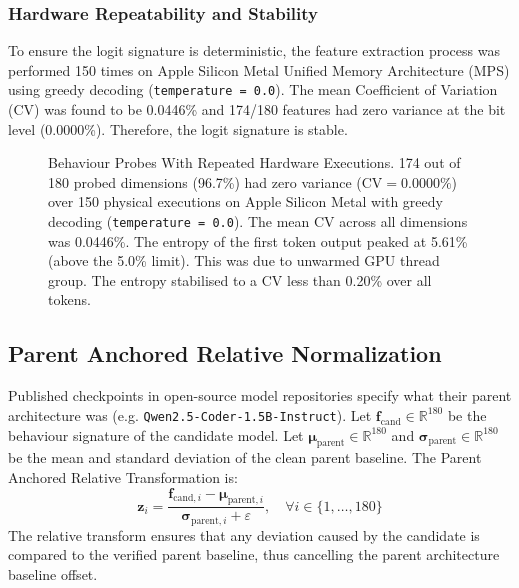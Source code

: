 \subsubsection{Hardware Repeatability and Stability}
To ensure the logit signature is deterministic, the feature extraction process was performed 150 times on Apple Silicon Metal Unified Memory Architecture (MPS) using greedy decoding (\texttt{temperature = 0.0}). The mean Coefficient of Variation (CV) was found to be 0.0446\% and 174/180 features had zero variance at the bit level (0.0000\%). Therefore, the logit signature is stable.

\begin{figure}[t]
\centering
{}
\caption{Behaviour Probes With Repeated Hardware Executions. 174 out of 180 probed dimensions (96.7\%) had zero variance ($\text{CV} = 0.0000\%$) over 150 physical executions on Apple Silicon Metal with greedy decoding (\texttt{temperature = 0.0}). The mean CV across all dimensions was 0.0446\%. The entropy of the first token output peaked at 5.61\% (above the 5.0\% limit). This was due to unwarmed GPU thread group. The entropy stabilised to a CV less than 0.20\% over all tokens.}
\label{fig:probe_repeatability}
\end{figure}

\subsection{Parent Anchored Relative Normalization}
\label{subsec:rq1_norm}
Published checkpoints in open-source model repositories specify what their parent architecture was (e.g. \nolinkurl{Qwen2.5-Coder-1.5B-Instruct}). Let $\mathbf{f}_{\text{cand}} \in \mathbb{R}^{180}$ be the behaviour signature of the candidate model. Let $\boldsymbol{\mu}_{\text{parent}} \in \mathbb{R}^{180}$ and $\boldsymbol{\sigma}_{\text{parent}} \in \mathbb{R}^{180}$ be the mean and standard deviation of the clean parent baseline. The Parent Anchored Relative Transformation is:
\begin{equation}
\mathbf{z}_i = \frac{\mathbf{f}_{\text{cand}, i} - \boldsymbol{\mu}_{\text{parent}, i}}{\boldsymbol{\sigma}_{\text{parent}, i} + \varepsilon}, \quad \forall i \in \{1, \dots, 180\}
\end{equation}
The relative transform ensures that any deviation caused by the candidate is compared to the verified parent baseline, thus cancelling the parent architecture baseline offset.


